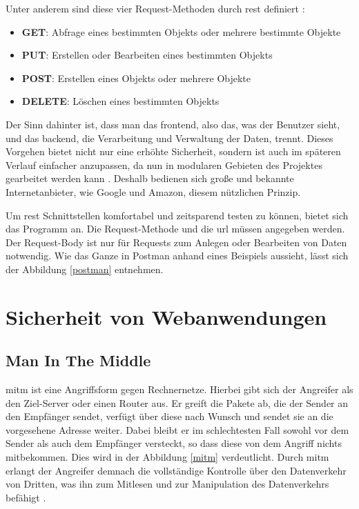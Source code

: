 Unter anderem sind diese vier Request-Methoden durch \gls{rest} definiert \cite[S.~260f]{client-server-book}:
\begin{itemize}
	\item \textbf{GET}: Abfrage eines bestimmten Objekts oder mehrere bestimmte Objekte
	\item \textbf{PUT}: Erstellen oder Bearbeiten eines bestimmten Objekts
	\item \textbf{POST}: Erstellen eines Objekts oder mehrere Objekte
	\item \textbf{DELETE}: Löschen eines bestimmten Objekts
\end{itemize}

Der Sinn dahinter ist, dass man das \gls{frontend}, also das, was der Benutzer sieht, und das \gls{backend}, die Verarbeitung und Verwaltung der Daten, trennt. Dieses Vorgehen bietet nicht nur eine erhöhte Sicherheit, sondern ist auch im späteren Verlauf einfacher anzupassen, da nun in modularen Gebieten des Projektes gearbeitet werden kann \cite[S.~260]{client-server-book}. Deshalb bedienen sich große und bekannte Internetanbieter, wie Google und Amazon, diesem nützlichen Prinzip.

Um \gls{rest} Schnittstellen komfortabel und zeitsparend testen zu können, bietet sich das Programm  an.
Die Request-Methode und die \gls{url} müssen angegeben werden. Der Request-Body ist nur für Requests zum Anlegen oder Bearbeiten von Daten notwendig. Wie das Ganze in Postman anhand eines Beispiels aussieht, lässt sich der Abbildung \ref{postman} entnehmen.


\clearpage

\section{Sicherheit von Webanwendungen}
\subsection{Man In The Middle}
\gls{mitm} ist eine Angriffsform gegen Rechnernetze.
Hierbei gibt sich der Angreifer als den Ziel-Server oder einen Router aus.
Er greift die Pakete ab, die der Sender an den Empfänger sendet, verfügt über diese nach Wunsch und sendet sie an die vorgesehene Adresse weiter. Dabei bleibt er im schlechtesten Fall sowohl vor dem Sender als auch dem Empfänger versteckt, so dass diese von dem Angriff nichts mitbekommen. Dies wird in der Abbildung \ref{mitm} verdeutlicht.
Durch \gls{mitm} erlangt der Angreifer demnach die vollständige Kontrolle über den Datenverkehr von Dritten, was ihn zum Mitlesen und zur Manipulation des Datenverkehrs befähigt \cite[S.~9]{websecurity-book}.

